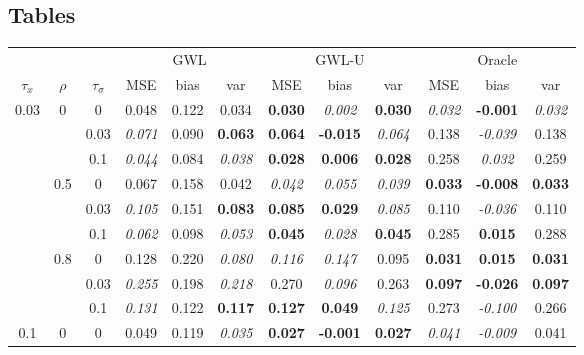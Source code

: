 \documentclass[authoryear, review, 11pt]{elsarticle}
\begin{document}
	\subsection{Tables}
\begin{table}[ht]
\begin{center}
\begin{tabular}{ccc | ccc | ccc | ccc }
&&&\multicolumn{3}{c}{GWL}&\multicolumn{3}{c}{GWL-U}&\multicolumn{3}{c}{Oracle}\\$\tau_x$ & $\rho$ & $\tau_\sigma$ & MSE & bias & var &  MSE & bias & var &  MSE & bias & var\\   \hline
\multirow{9}{*}{0.03} & \multirow{3}{*}{0} & 0 & 0.048 & 0.122 & 0.034 & \textbf{0.030} & \emph{0.002} & \textbf{0.030} & \emph{0.032} & \textbf{-0.001} & \emph{0.032} \\ 
 &  & 0.03 &   \emph{0.071} & 0.090 & \textbf{0.063} & \textbf{0.064} & \textbf{-0.015} & \emph{0.064} & 0.138 & \emph{-0.039} & 0.138 \\ 
 &  & 0.1 &   \emph{0.044} & 0.084 & \emph{0.038} & \textbf{0.028} & \textbf{0.006} & \textbf{0.028} & 0.258 & \emph{0.032} & 0.259 \\ \cline{2-12}
 & \multirow{3}{*}{0.5} & 0 &   0.067 & 0.158 & 0.042 & \emph{0.042} & \emph{0.055} & \emph{0.039} & \textbf{0.033} & \textbf{-0.008} & \textbf{0.033} \\ 
 &  & 0.03 &   \emph{0.105} & 0.151 & \textbf{0.083} & \textbf{0.085} & \textbf{0.029} & \emph{0.085} & 0.110 & \emph{-0.036} & 0.110 \\ 
 &  & 0.1 &   \emph{0.062} & 0.098 & \emph{0.053} & \textbf{0.045} & \emph{0.028} & \textbf{0.045} & 0.285 & \textbf{0.015} & 0.288 \\ \cline{2-12}
 & \multirow{3}{*}{0.8} & 0 &   0.128 & 0.220 & \emph{0.080} & \emph{0.116} & \emph{0.147} & 0.095 & \textbf{0.031} & \textbf{0.015} & \textbf{0.031} \\ 
 &  & 0.03 &   \emph{0.255} & 0.198 & \emph{0.218} & 0.270 & \emph{0.096} & 0.263 & \textbf{0.097} & \textbf{-0.026} & \textbf{0.097} \\ 
 &  & 0.1 &   \emph{0.131} & 0.122 & \textbf{0.117} & \textbf{0.127} & \textbf{0.049} & \emph{0.125} & 0.273 & \emph{-0.100} & 0.266 \\ \cline{1-12}
\multirow{9}{*}{0.1} & \multirow{3}{*}{0} & 0 &   0.049 & 0.119 & \emph{0.035} & \textbf{0.027} & \textbf{-0.001} & \textbf{0.027} & \emph{0.041} & \emph{-0.009} & 0.041 \\ 

\end{tabular}
\end{center}
\end{table}
\end{document}
